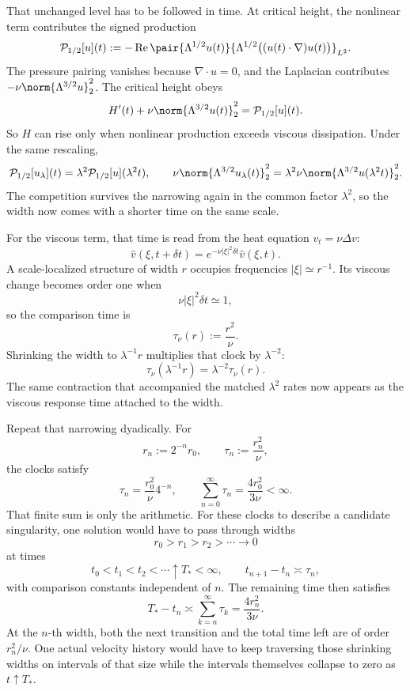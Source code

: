 That unchanged level has to be followed in time. At critical height, the nonlinear term contributes the signed production
\[
  \mathcal P_{1/2}[u](t)
  :=
  -\operatorname{Re}
  \pair
    {\Lambda^{1/2}u(t)}
    {\Lambda^{1/2}\bigl((u(t)\cdot\nabla)u(t)\bigr)}_{L^2}.
\]
The pressure pairing vanishes because \(\nabla\cdot u=0\), and the Laplacian contributes \(-\nu\norm{\Lambda^{3/2}u}_2^2\). The critical height obeys
\[
  H'(t)
  +
  \nu\norm{\Lambda^{3/2}u(t)}_2^2
  =
  \mathcal P_{1/2}[u](t).
\]
So \(H\) can rise only when nonlinear production exceeds viscous dissipation. Under the same rescaling,
\[
  \mathcal P_{1/2}[u_\lambda](t)
  =
  \lambda^2\mathcal P_{1/2}[u](\lambda^2t),
  \qquad
  \nu\norm{\Lambda^{3/2}u_\lambda(t)}_2^2
  =
  \lambda^2\nu\norm{\Lambda^{3/2}u(\lambda^2t)}_2^2.
\]
The competition survives the narrowing again in the common factor \(\lambda^2\), so the width now comes with a shorter time on the same scale.


For the viscous term, that time is read from the heat equation \(v_t=\nu\Delta v\):
\[
  \widehat v(\xi,t+\delta t)
  =
  e^{-\nu|\xi|^2\delta t}\widehat v(\xi,t).
\]
A scale-localized structure of width \(r\) occupies frequencies \(|\xi|\simeq r^{-1}\). Its viscous change becomes order one when
\[
  \nu|\xi|^2\delta t\simeq1,
\]
so the comparison time is
\[
  \tau_\nu(r)
  :=
  \frac{r^2}{\nu}.
\]
Shrinking the width to \(\lambda^{-1}r\) multiplies that clock by \(\lambda^{-2}\):
\[
  \tau_\nu(\lambda^{-1}r)
  =
  \lambda^{-2}\tau_\nu(r).
\]
The same contraction that accompanied the matched \(\lambda^2\) rates now appears as the viscous response time attached to the width.


Repeat that narrowing dyadically. For
\[
  r_n:=2^{-n}r_0,
  \qquad
  \tau_n:=\frac{r_n^2}{\nu},
\]
the clocks satisfy
\[
  \tau_n
  =
  \frac{r_0^2}{\nu}4^{-n},
  \qquad
  \sum_{n=0}^{\infty}\tau_n
  =
  \frac{4r_0^2}{3\nu}
  <
  \infty.
\]
That finite sum is only the arithmetic. For these clocks to describe a candidate singularity, one \NavierStokes{} solution would have to pass through widths
\[
  r_0>r_1>r_2>\cdots\longrightarrow0
\]
at times
\[
  t_0<t_1<t_2<\cdots\uparrow T_*<\infty,
  \qquad
  t_{n+1}-t_n\asymp\tau_n,
\]
with comparison constants independent of \(n\). The remaining time then satisfies
\[
  T_*-t_n
  \asymp
  \sum_{k=n}^{\infty}\tau_k
  =
  \frac{4r_n^2}{3\nu}.
\]
At the \(n\)-th width, both the next transition and the total time left are of order \(r_n^2/\nu\). One actual velocity history would have to keep traversing those shrinking widths on intervals of that size while the intervals themselves collapse to zero as \(t\uparrow T_*\).
